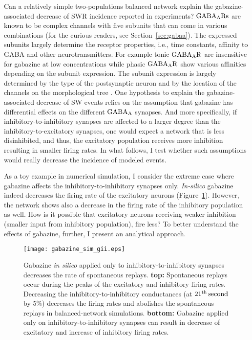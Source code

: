     Can a relatively simple two-populations balanced network explain the
    gabazine-associated decrease of SWR incidence reported in experiments?
    $\rm GABA_A Rs$ are known to be complex channels
    with five subunits that can come in various combinations (for the curious
    readers, see Section~\ref{sec:gabaa}). The expressed subunits largely
    determine the receptor properties, i.e., time constants, affinity to GABA
    and other neurotransmitters. For example tonic $\rm GABA_A R$ are
    insensitive for gabazine \citep{Bai2001, Yeung2003, Behrens2007} at low
    concentrations while phasic $\rm GABA_A R$ show various affinities
    depending on the subunit expression. The subunit expression is largely
    determined by the type of the postsynaptic neuron and by the location of
    the channels on the morphological tree \citep{Sieghart2002}. One hypothesis
    to explain the gabazine-associated decrease of SW events relies on the
    assumption that gabazine has differential effects on the different $\rm
    GABA_A$ synapses. And more specifically, if inhibitory-to-inhibitory
    synapses are affected to a larger degree than the inhibitory-to-excitatory
    synapses, one would expect a network that is less disinhibited, and thus,
    the excitatory population receives more inhibition resulting in smaller
    firing rates. In what follows, I test whether such assumptions would really
    decrease the incidence of modeled events.

    As a toy example in numerical simulation, I consider the extreme case where
    gabazine affects the inhibitory-to-inhibitory synapses only. \textit{
    In-silico} gabazine indeed decreases the firing rate of the excitatory
    neurons (Figure~\ref{fig:gabazine_sim_giionly}). However, the network shows
    also a decrease in the firing rate of the inhibitory population as well.
    How is it possible that excitatory neurons receiving weaker inhibition
    (smaller input from inhibitory population), fire less? To better understand
    the effects of gabazine, further, I present an analytical approach.
    
    \begin{figure}
      \center
      \texttt{[image: gabazine\_sim\_gii.eps]}
      \caption{
        Gabazine {\it in silico} applied only to inhibitory-to-inhibitory
        synapses decreases the rate of spontaneous replays. {\bf top:}
        Spontaneous replays occur during the peaks of the excitatory and
        inhibitory firing rates. Decreasing the inhibitory-to-inhibitory
        conductances (at $21^{\rm th}\, \rm second$ by 5\%) decreases the
        firing rates and abolishes the spontaneous replays in balanced-network
        simulations. {\bf bottom:} Gabazine applied only on
        inhibitory-to-inhibitory synapses can result in decrease of excitatory
        and increase of inhibitory firing rates.
      }
    \label{fig:gabazine_sim_giionly}
    \end{figure}

